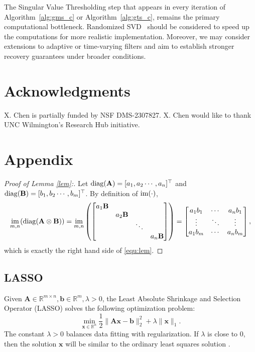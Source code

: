 \documentclass[10pt]{article}  	%
\theoremstyle{definition}
\theoremstyle{definition}
\newcommand{\R}{{\mathbb{R}}}
\newcommand{\diag}{{\rm{diag}}}
\DeclareMathOperator*{\im}{{\rm{im}}}
\newcommand{\vb}{\mathbf{b}}
\newcommand{\vx}{\mathbf{x}}
\newcommand{\mA}{\mathbf{A}}
\newcommand{\mB}{\mathbf{B}}
\theoremstyle{remark}
\begin{document}
The Singular Value Thresholding step that appears in every iteration of Algorithm~\ref{alg:gms_c} or Algorithm~\ref{alg:gts_c}, remains the primary computational bottleneck. Randomized SVD~\cite{rSVD} should be considered to speed up the computations for more realistic implementation. Moreover, 
we may consider extensions to adaptive or time-varying filters and aim to establish stronger recovery guarantees under broader conditions.

\section*{Acknowledgments}

X. Chen is partially funded by NSF DMS-2307827. X. Chen would like to thank UNC
Wilmington’s Research Hub initiative.

\section*{Appendix}
\begin{proof}[Proof of Lemma \ref{lem}:]

Let $\diag(\mA) = [a_1,a_2 \cdots , a_n]^\top$ and $\diag(\mB) = [ b_1, b_2 \cdots , b_m]^\top$. 
By definition of $\im(\cdot)$, 
\begin{align*}
\im_{m, n}(\diag(\mA \otimes \mB)) = \im_{m, n}\left(
\begin{bmatrix}
a_1\mB\\
&a_2\mB\\
&&\ddots\\
&&&a_n\mB\end{bmatrix}\right)=
\begin{bmatrix}
a_1b_1 & \cdots & a_nb_1 \\
\vdots & \ddots & \vdots \\
a_1b_m & \cdots & a_nb_m
\end{bmatrix},
\end{align*}
which is exactly the right hand side of \eqref{equ:lem}. 
\end{proof}

\subsection*{LASSO}
Given $\mA\in\R^{m\times n}, \vb\in\R^m, \lambda>0$, the Least Absolute Shrinkage and Selection Operator (LASSO)  solves the following optimization problem:
\begin{equation}\label{equ:lasso}
\min_{\vx\in\R^{n}} \frac{1}{2} \| \mA \vx - \vb \|_2^2 + \lambda \| \vx \|_1.
\end{equation}
The constant $\lambda > 0$ balances data fitting with regularization. If $\lambda$ is close to 0, then the solution $\vx$ will be similar to the ordinary least squares solution  \cite{HT09}. 
\end{document}

